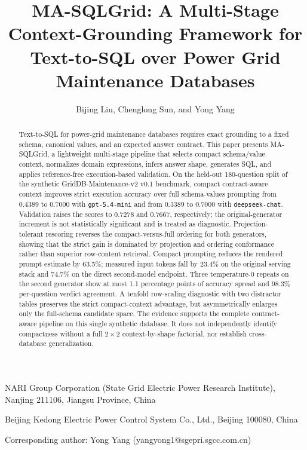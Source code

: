 \documentclass{article}
\title{MA-SQLGrid: A Multi-Stage Context-Grounding Framework for Text-to-SQL over Power Grid Maintenance Databases}
\author{Bijing Liu, Chenglong Sun, and Yong Yang}
\date{}
\begin{document}
\maketitle

\begin{center}
NARI Group Corporation (State Grid Electric Power Research Institute), Nanjing 211106, Jiangsu Province, China

Beijing Kedong Electric Power Control System Co., Ltd., Beijing 100080, China

Corresponding author: Yong Yang (yangyong1@sgepri.sgcc.com.cn)
\end{center}

\begin{abstract}
Text-to-SQL for power-grid maintenance databases requires exact grounding to a fixed schema, canonical values, and an expected answer contract. This paper presents MA-SQLGrid, a lightweight multi-stage pipeline that selects compact schema/value context, normalizes domain expressions, infers answer shape, generates SQL, and applies reference-free execution-based validation. On the held-out 180-question split of the synthetic GridDB-Maintenance-v2 v0.1 benchmark, compact contract-aware context improves strict execution accuracy over full schema-values prompting from 0.4389 to 0.7000 with \texttt{gpt-5.4-mini} and from 0.3389 to 0.7000 with \texttt{deepseek-chat}. Validation raises the scores to 0.7278 and 0.7667, respectively; the original-generator increment is not statistically significant and is treated as diagnostic. Projection-tolerant rescoring reverses the compact-versus-full ordering for both generators, showing that the strict gain is dominated by projection and ordering conformance rather than superior row-content retrieval. Compact prompting reduces the rendered prompt estimate by 63.5\%; measured input tokens fall by 23.4\% on the original serving stack and 74.7\% on the direct second-model endpoint. Three temperature-0 repeats on the second generator show at most 1.1 percentage points of accuracy spread and 98.3\% per-question verdict agreement. A tenfold row-scaling diagnostic with two distractor tables preserves the strict compact-context advantage, but asymmetrically enlarges only the full-schema candidate space. The evidence supports the complete contract-aware pipeline on this single synthetic database. It does not independently identify compactness without a full $2\times2$ context-by-shape factorial, nor establish cross-database generalization.
\end{abstract}
\end{document}
